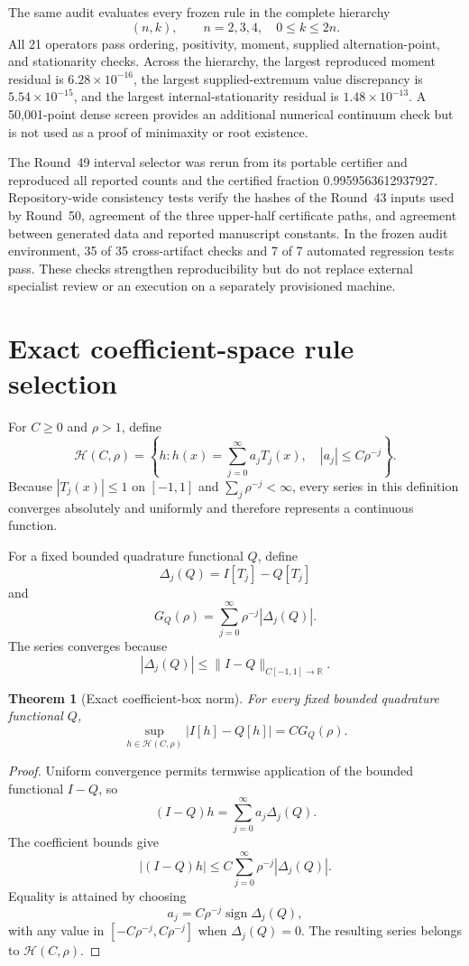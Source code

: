 \documentclass[preprint,12pt]{elsarticle}
\newtheorem{theorem}{Theorem}
\theoremstyle{remark}
\begin{document}
The same audit evaluates every frozen rule in the complete hierarchy
\[
(n,k),\qquad n=2,3,4,\quad 0\leq k\leq2n.
\]
All 21 operators pass ordering, positivity, moment, supplied
alternation-point, and stationarity checks. Across the hierarchy, the
largest reproduced moment residual is \(6.28\times10^{-16}\), the
largest supplied-extremum value discrepancy is
\(5.54\times10^{-15}\), and the largest internal-stationarity residual
is \(1.48\times10^{-13}\). A 50,001-point dense screen provides an
additional numerical continuum check but is not used as a proof of
minimaxity or root existence.

The Round~49 interval selector was rerun from its portable certifier and
reproduced all reported counts and the certified fraction
0.9959563612937927. Repository-wide consistency tests verify the hashes
of the Round~43 inputs used by Round~50, agreement of the three
upper-half certificate paths, and agreement between generated data and
reported manuscript constants. In the frozen audit environment, 35 of
35 cross-artifact checks and 7 of 7 automated regression tests pass.
These checks strengthen reproducibility but do not replace external
specialist review or an execution on a separately provisioned machine.

\section{Exact coefficient-space rule selection}

For \(C\geq0\) and \(\rho>1\), define
\[
\mathcal H(C,\rho)
=
\left\{
h:
h(x)=\sum_{j=0}^{\infty}a_jT_j(x),
\quad
|a_j|\leq C\rho^{-j}
\right\}.
\]
Because \(|T_j(x)|\leq1\) on \([-1,1]\) and
\(\sum_j\rho^{-j}<\infty\), every series in this definition converges
absolutely and uniformly and therefore represents a continuous
function.

For a fixed bounded quadrature functional \(Q\), define
\[
\Delta_j(Q)=I[T_j]-Q[T_j]
\]
and
\[
G_Q(\rho)
=
\sum_{j=0}^{\infty}\rho^{-j}|\Delta_j(Q)|.
\]
The series converges because
\[
|\Delta_j(Q)|
\leq
\|I-Q\|_{C[-1,1]\to\mathbb R}.
\]

\begin{theorem}[Exact coefficient-box norm]
For every fixed bounded quadrature functional \(Q\),
\[
\sup_{h\in\mathcal H(C,\rho)}
|I[h]-Q[h]|
=
C G_Q(\rho).
\]
\end{theorem}

\begin{proof}
Uniform convergence permits termwise application of the bounded
functional \(I-Q\), so
\[
(I-Q)h
=
\sum_{j=0}^{\infty}a_j\Delta_j(Q).
\]
The coefficient bounds give
\[
|(I-Q)h|
\leq
C\sum_{j=0}^{\infty}
\rho^{-j}|\Delta_j(Q)|.
\]
Equality is attained by choosing
\[
a_j
=
C\rho^{-j}\operatorname{sign}\Delta_j(Q),
\]
with any value in \([-C\rho^{-j},C\rho^{-j}]\) when
\(\Delta_j(Q)=0\). The resulting series belongs to
\(\mathcal H(C,\rho)\).
\end{proof}
\end{document}
